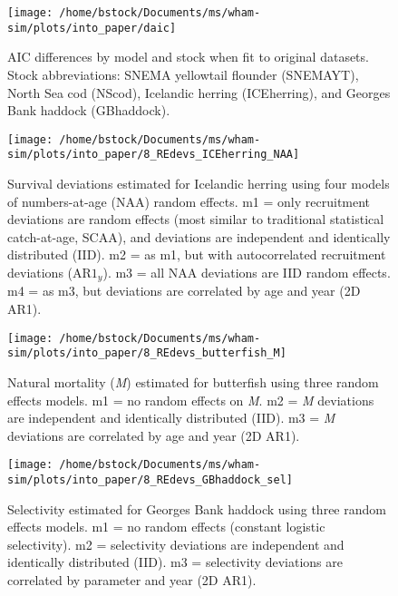 \documentclass[]{article}
\begin{document}
\pagebreak

\begin{landscape}
\begin{figure}

{\centering \texttt{[image: /home/bstock/Documents/ms/wham-sim/plots/into\_paper/daic]} 

}

\caption{AIC differences by model and stock when fit to original datasets. Stock abbreviations: SNEMA yellowtail flounder (SNEMAYT), North Sea cod (NScod), Icelandic herring (ICEherring), and Georges Bank haddock (GBhaddock).}\label{fig:daic}
\end{figure}
\end{landscape}

\pagebreak

\begin{figure}

{\centering \texttt{[image: /home/bstock/Documents/ms/wham-sim/plots/into\_paper/8\_REdevs\_ICEherring\_NAA]} 

}

\caption{Survival deviations estimated for Icelandic herring using four models of numbers-at-age (NAA) random effects. m1 = only recruitment deviations are random effects (most similar to traditional statistical catch-at-age, SCAA), and deviations are independent and identically distributed (IID). m2 = as m1, but with autocorrelated recruitment deviations ($\text{AR1}_y$). m3 = all NAA deviations are IID random effects. m4 = as m3, but deviations are correlated by age and year (2D AR1).}\label{fig:devs-ICEherring-naa}
\end{figure}

\pagebreak

\begin{figure}

{\centering \texttt{[image: /home/bstock/Documents/ms/wham-sim/plots/into\_paper/8\_REdevs\_butterfish\_M]} 

}

\caption{Natural mortality (\textit{M}) estimated for butterfish using three random effects models. m1 = no random effects on \textit{M}. m2 = \textit{M} deviations are independent and identically distributed (IID). m3 = \textit{M} deviations are correlated by age and year (2D AR1).}\label{fig:devs-butterfish-m}
\end{figure}

\pagebreak

\begin{figure}

{\centering \texttt{[image: /home/bstock/Documents/ms/wham-sim/plots/into\_paper/8\_REdevs\_GBhaddock\_sel]} 

}

\caption{Selectivity estimated for Georges Bank haddock using three random effects models. m1 = no random effects (constant logistic selectivity). m2 = selectivity deviations are independent and identically distributed (IID). m3 = selectivity deviations are correlated by parameter and year (2D AR1).}\label{fig:devs-GBhaddock-sel}
\end{figure}
\end{document}
